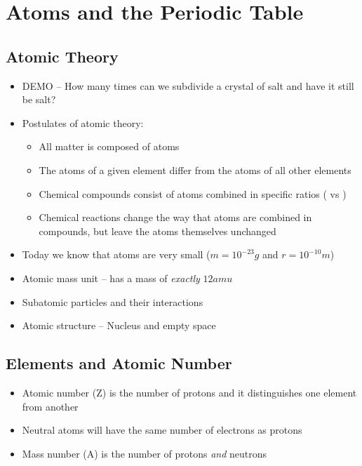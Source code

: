 \documentclass[12pt, openany, letterpaper]{memoir}
\begin{document}
\chapter{Atoms and the Periodic Table}%
\section{Atomic Theory}
\begin{itemize}
	\item DEMO -- How many times can we subdivide a crystal of salt and have it still be salt?
	\item Postulates of atomic theory:
	\begin{itemize}
		\item All matter is composed of atoms
		\item The atoms of a given element differ from the atoms of all other elements
		\item Chemical compounds consist of atoms combined in specific ratios ( vs )
		\item Chemical reactions change the way that atoms are combined in compounds, but leave the atoms themselves unchanged
	\end{itemize}
	\item Today we know that atoms are very small ($m=10^{-23}g$ and $r=10^{-10}m$)
	\item Atomic mass unit --  has a mass of \emph{exactly} $12amu$
	\item Subatomic particles and their interactions
	\item Atomic structure -- Nucleus and empty space
\end{itemize}
\section{Elements and Atomic Number}
\begin{itemize}
	\item Atomic number (Z) is the number of protons and it distinguishes one element from another
	\item Neutral atoms will have the same number of electrons as protons
	\item Mass number (A) is the number of protons \emph{and} neutrons	
\end{itemize}
\end{document}
